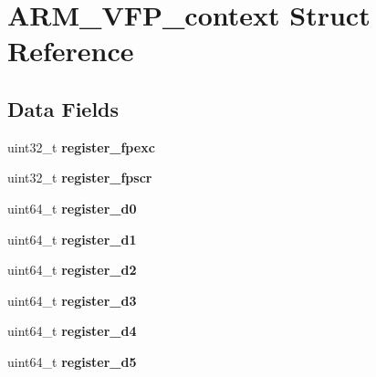 \hypertarget{structARM__VFP__context}{}\section{A\+R\+M\+\_\+\+V\+F\+P\+\_\+context Struct Reference}
\label{structARM__VFP__context}
\subsection*{Data Fields}
\begin{DoxyCompactItemize}
\item 
\mbox{\label{structARM__VFP__context_a14178eb8498ee8e88444c79166dbc972}} 
uint32\+\_\+t {\bfseries register\+\_\+fpexc}
\item 
\mbox{\label{structARM__VFP__context_a32358fed4116a4b0182e38c66f3ff439}} 
uint32\+\_\+t {\bfseries register\+\_\+fpscr}
\item 
\mbox{\label{structARM__VFP__context_aaefed40319118e0d0bd37cdea72098b3}} 
uint64\+\_\+t {\bfseries register\+\_\+d0}
\item 
\mbox{\label{structARM__VFP__context_a0c568fdb46336eb10ad31b591f15f5b2}} 
uint64\+\_\+t {\bfseries register\+\_\+d1}
\item 
\mbox{\label{structARM__VFP__context_ab6d7e36dd07929deca2b96b2b44fc1c5}} 
uint64\+\_\+t {\bfseries register\+\_\+d2}
\item 
\mbox{\label{structARM__VFP__context_a2af380e47daf1cc32b1dbe89715c48fc}} 
uint64\+\_\+t {\bfseries register\+\_\+d3}
\item 
\mbox{\label{structARM__VFP__context_a3fef0e68cdc128514b5d871a7c413919}} 
uint64\+\_\+t {\bfseries register\+\_\+d4}
\item 
\mbox{\label{structARM__VFP__context_a1a5be7df814f6d9888cc817f866410ae}} 
uint64\+\_\+t {\bfseries register\+\_\+d5}
\item 
\mbox{\label{structARM__VFP__context_af3e5d17899f866ccd6755b89c82b7305}} 

\end{DoxyCompactItemize}

